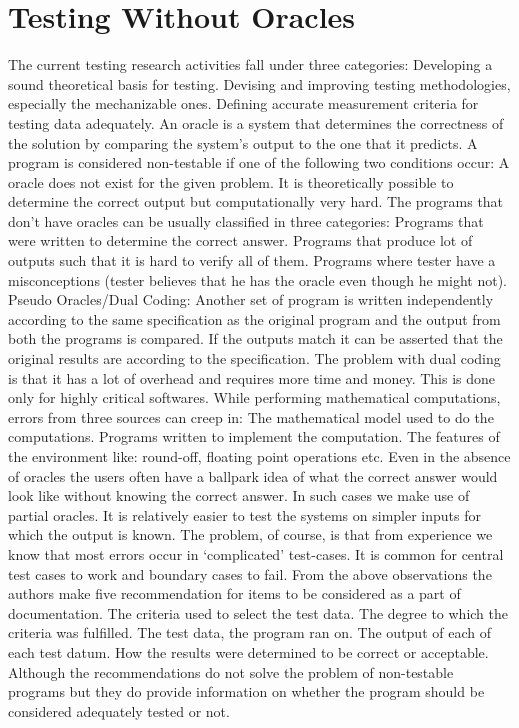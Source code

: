 \section{Testing Without Oracles}
The current testing research activities fall under three categories:
Developing a sound theoretical basis for testing.
Devising and improving testing methodologies, especially the mechanizable ones.
Defining accurate measurement criteria for testing data adequately.
An oracle is a system that determines the correctness of the solution by comparing the system’s output to the one that it predicts.
A program is considered non-testable if one of the following two conditions occur:
A oracle does not exist for the given problem.
It is theoretically possible to determine the correct output but computationally very hard.
The programs that don’t have oracles can be usually classified in three categories:
Programs that were written to determine the correct answer.
Programs that produce lot of outputs such that it is hard to verify all of them.
Programs where tester have a misconceptions (tester believes that he has the oracle even though he might not).
Pseudo Oracles/Dual Coding:
Another set of program is written independently according to the same specification as the original program and the output from both the programs is compared. If the outputs match it can be asserted that the original results are according to the specification. The problem with dual coding is that it has a lot of overhead and requires more time and money. This is done only for highly critical softwares.
While performing mathematical computations, errors from three sources can creep in:
The mathematical model used to do the computations.
Programs written to implement the computation.
The features of the environment like: round-off, floating point operations etc.
Even in the absence of oracles the users often have a ballpark idea of what the correct answer would look like without knowing the correct answer. In such cases we make use of partial oracles. It is relatively easier to test the systems on simpler inputs for which the output is known. The problem, of course, is that from experience we know that most errors occur in ‘complicated’ test-cases. It is common for central test cases to work and boundary cases to fail. From the above observations the authors make five recommendation for items to be considered as a part of documentation.
The criteria used to select the test data.
The degree to which the criteria was fulfilled.
The test data, the program ran on.
The output of each of each test datum.
How the results were determined to be correct or acceptable.
Although the recommendations do not solve the problem of non-testable programs but they do provide information on whether the program should be considered adequately tested or not.

